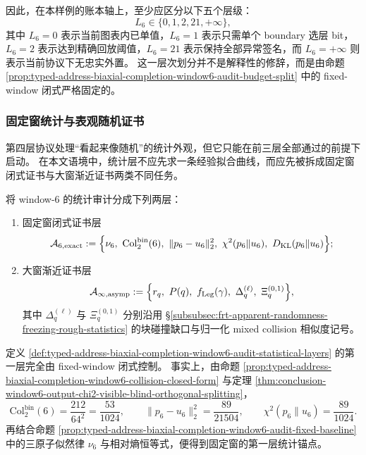 因此，在本样例的账本轴上，至少应区分以下五个层级：
\[
L_6\in\{0,1,2,21,+\infty\},
\]
其中 \(L_6=0\) 表示当前图表内已单值，\(L_6=1\) 表示只需单个 boundary 选层 bit，\(L_6=2\) 表示达到精确回放阈值，\(L_6=21\) 表示保持全部异常签名，而 \(L_6=+\infty\) 则表示当前协议下无忠实外置。
这一层次划分并不是解释性的修辞，而是由命题 \ref{prop:typed-address-biaxial-completion-window6-audit-budget-split} 中的 fixed-window 闭式严格固定的。

\subsubsection{固定窗统计与表观随机证书}\label{subsubsec:typed-address-biaxial-completion-window6-numerical-audit-fixed-window-statistics}
第四层协议处理“看起来像随机”的统计外观，但它只能在前三层全部通过的前提下启动。
在本文语境中，统计层不应先求一条经验拟合曲线，而应先被拆成固定窗闭式证书与大窗渐近证书两类不同任务。

\begin{definition}\label{def:typed-address-biaxial-completion-window6-audit-statistical-layers}
将 window-\(6\) 的统计审计分成下列两层：
\begin{enumerate}
  \item 固定窗闭式证书层
  \[
  \mathcal A_{6,\mathrm{exact}}
  :=
  \Bigl\{
  \nu_6,\ 
  \mathrm{Col}^{\mathrm{bin}}_2(6),\
  \|p_6-u_6\|_2^2,\
  \chi^2(p_6\|u_6),\
  D_{\mathrm{KL}}(p_6\|u_6)
  \Bigr\};
  \]
  \item 大窗渐近证书层
  \[
  \mathcal A_{\infty,\mathrm{asymp}}
  :=
  \Bigl\{
  r_q,\ 
  P(q),\ 
  f_{\mathrm{Leg}}(\gamma),\ 
  \Delta_q^{(\ell)},\ 
  \Xi_q^{(0,1)}
  \Bigr\},
  \]
  其中 \(\Delta_q^{(\ell)}\) 与 \(\Xi_q^{(0,1)}\) 分别沿用 \S\ref{subsubsec:frt-apparent-randomness-freezing-rough-statistics} 的块碰撞缺口与归一化 mixed collision 相似度记号。
\end{enumerate}
\end{definition}

定义 \ref{def:typed-address-biaxial-completion-window6-audit-statistical-layers} 的第一层完全由 fixed-window 闭式控制。
事实上，由命题 \ref{prop:typed-address-biaxial-completion-window6-collision-closed-form} 与定理 \ref{thm:conclusion-window6-output-chi2-visible-blind-orthogonal-splitting}，
\[
\mathrm{Col}^{\mathrm{bin}}_2(6)=\frac{212}{64^2}=\frac{53}{1024},
\qquad
\|p_6-u_6\|_2^2=\frac{89}{21504},
\qquad
\chi^2(p_6\|u_6)=\frac{89}{1024}.
\]
再结合命题 \ref{prop:typed-address-biaxial-completion-window6-audit-fixed-baseline} 中的三原子似然律 \(\nu_6\) 与相对熵恒等式，便得到固定窗的第一层统计锚点。

